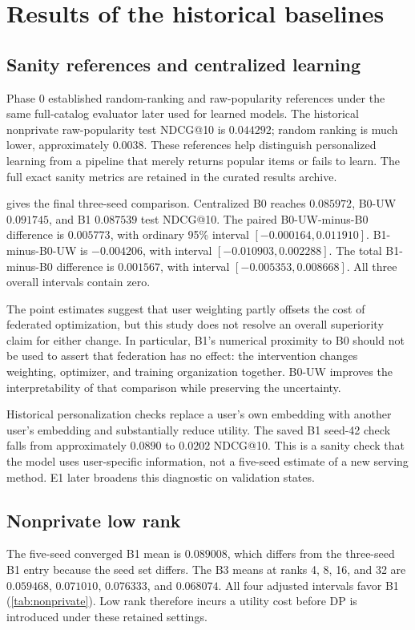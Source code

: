 \section{Results of the historical baselines}
\label{sec:baselines}
\subsection{Sanity references and centralized learning}
Phase 0 established random-ranking and raw-popularity references under the
same full-catalog evaluator later used for learned models. The historical
nonprivate raw-popularity test NDCG@10 is $0.044292$; random ranking is much
lower, approximately $0.0038$. These references help distinguish personalized
learning from a pipeline that merely returns popular items or fails to learn.
The full exact sanity metrics are retained in the curated results archive.


 gives the final three-seed comparison. Centralized B0 reaches
$0.085972$, B0-UW $0.091745$, and B1 $0.087539$ test NDCG@10. The paired
B0-UW-minus-B0 difference is $0.005773$, with ordinary 95\% interval
$[-0.000164,0.011910]$. B1-minus-B0-UW is $-0.004206$, with interval
$[-0.010903,0.002288]$. The total B1-minus-B0 difference is $0.001567$,
with interval $[-0.005353,0.008668]$. All three overall intervals contain zero.

The point estimates suggest that user weighting partly offsets the cost of
federated optimization, but this study does not resolve an overall superiority
claim for either change. In particular, B1's numerical proximity to B0 should
not be used to assert that federation has no effect: the intervention changes
weighting, optimizer, and training organization together. B0-UW improves the
interpretability of that comparison while preserving the uncertainty.

Historical personalization checks replace a user's own embedding with another
user's embedding and substantially reduce utility. The saved B1 seed-42 check
falls from approximately $0.0890$ to $0.0202$ NDCG@10. This is a sanity check
that the model uses user-specific information, not a five-seed estimate of a
new serving method. E1 later broadens this diagnostic on validation states.

\subsection{Nonprivate low rank}

The five-seed converged B1 mean is $0.089008$, which differs from the three-seed
B1 entry because the seed set differs. The B3 means at ranks 4, 8, 16, and 32
are $0.059468$, $0.071010$, $0.076333$, and $0.068074$. All four adjusted
intervals favor B1 (\cref{tab:nonprivate}). Low rank therefore incurs a utility
cost before DP is introduced under these retained settings.

